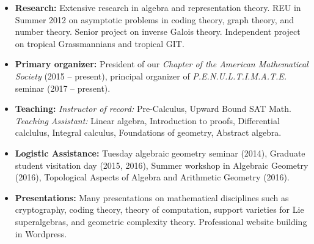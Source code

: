 \documentclass[10pt,a4paper]{article}
\begin{document}
\begin{itemize}
  \item \textbf{Research:} Extensive research in algebra and representation theory. REU in Summer 2012 on asymptotic problems in coding theory, graph theory, and number theory. Senior project on inverse Galois theory. Independent project on tropical Grassmannians and tropical GIT.
\item \textbf{Primary organizer:} President of our \emph{Chapter of the American Mathematical Society} (2015 -- present), principal organizer of \emph{P.E.N.U.L.T.I.M.A.T.E.} seminar (2017 -- present).
\item \textbf{Teaching:} \emph{Instructor of record:} Pre-Calculus, Upward Bound SAT Math. \emph{Teaching Assistant:} Linear algebra, Introduction to proofs, Differential calclulus, Integral calculus, Foundations of geometry, Abstract algebra.
\item \textbf{Logistic Assistance:} Tuesday algebraic geometry seminar (2014), Graduate student visitation day (2015, 2016), Summer workshop in Algebraic Geometry (2016), Topological Aspects of Algebra and Arithmetic Geometry (2016).
\item \textbf{Presentations:} Many presentations on mathematical disciplines such as cryptography, coding theory, theory of computation, support varieties for Lie superalgebras, and geometric complexity theory. Professional website building in Wordpress. 
\end{itemize}
\end{document}
